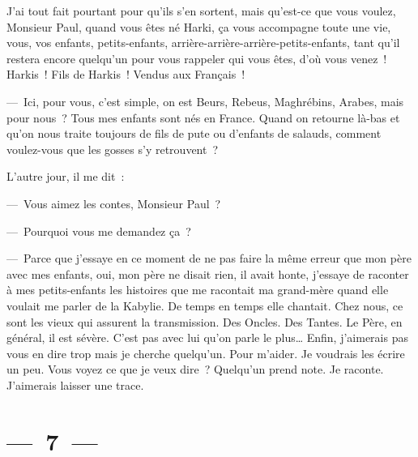 \documentclass[twoside]{book} %
\begin{document}
\noindent J’ai tout fait pourtant pour qu’ils s’en sortent, mais qu’est-ce que vous voulez, Monsieur Paul, quand vous êtes né Harki, ça vous accompagne toute une vie, vous, vos enfants, petits-enfants, arrière-arrière-arrière-petits-enfants, tant qu’il restera encore quelqu’un pour vous rappeler qui vous êtes, d’où vous venez ! Harkis ! Fils de Harkis ! Vendus aux Français !\par
— Ici, pour vous, c’est simple, on est Beurs, Rebeus, Maghrébins, Arabes, mais pour nous ? Tous mes enfants sont nés en France. Quand on retourne là-bas et qu’on nous traite toujours de fils de pute ou d’enfants de salauds, comment voulez-vous que les gosses s’y retrouvent ?\par
L’autre jour, il me dit :\par
— Vous aimez les contes, Monsieur Paul ?\par
— Pourquoi vous me demandez ça ?\par
— Parce que j’essaye en ce moment de ne pas faire la même erreur que mon père avec mes enfants, oui, mon père ne disait rien, il avait honte, j’essaye de raconter à mes petits-enfants les histoires que me racontait ma grand-mère quand elle voulait me parler de la Kabylie. De temps en temps elle chantait. Chez nous, ce sont les vieux qui assurent la transmission. Des Oncles. Des Tantes. Le Père, en général, il est sévère. C’est pas avec lui qu’on parle le plus… Enfin, j’aimerais pas vous en dire trop mais je cherche quelqu’un. Pour m’aider. Je voudrais les écrire un peu. Vous voyez ce que je veux dire ? Quelqu’un prend note. Je raconte. J’aimerais laisser une trace.

\section[{— 7 —}]{— 7 —}
\renewcommand{\leftmark}{— 7 —}
\end{document}
